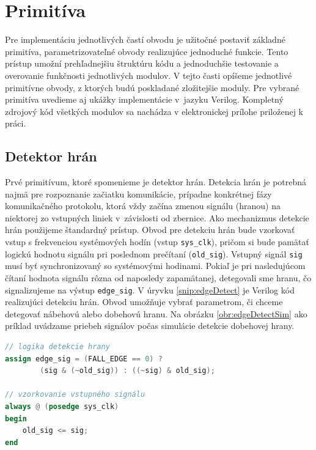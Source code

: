 \section{Primitíva} \label{sek:primitives}
Pre implementáciu jednotlivých častí obvodu je užitočné postaviť základné primitíva, parametrizovateľné obvody realizujúce jednoduché funkcie. Tento prístup umožní prehľadnejšiu štruktúru kódu a jednoduchšie testovanie a overovanie funkčnosti jednotlivých modulov. V tejto časti opíšeme jednotlivé primitívne obvody, z ktorých budú poskladané zložitejšie moduly. Pre vybrané primitíva uvedieme aj ukážky implementácie v~jazyku Verilog. Kompletný zdrojový kód všetkých modulov sa nachádza v elektronickej prílohe priloženej k práci.

\subsection{Detektor hrán} \label{subsek:edgeDetector}
Prvé primitívum, ktoré spomenieme je detektor hrán. Detekcia hrán je potrebná najmä pre rozpoznanie začiatku komunikácie, prípadne konkrétnej fázy komunikačného protokolu, ktorá vždy začína zmenou signálu (hranou) na niektorej zo vstupných liniek v~závislosti od zbernice. Ako mechanizmus detekcie hrán použijeme štandardný prístup. Obvod pre detekciu hrán bude vzorkovať vstup s frekvenciou systémových hodín (vstup \texttt{sys\_clk}), pričom si bude pamätať logickú hodnotu signálu pri poslednom prečítaní (\texttt{old\_sig}). Vstupný signál \texttt{sig} musí byť synchronizovaný so systémovými hodinami. Pokiaľ je pri nasledujúcom čítaní hodnota signálu rôzna od naposledy zapamätanej, detegovali sme hranu, čo signalizujeme na výstup \texttt{edge\_sig}. V úryvku \ref{snip:edgeDetect} je Verilog kód realizujúci detekciu hrán. Obvod umožňuje vybrať parametrom, či chceme detegovať nábehovú alebo dobehovú hranu. Na obrázku \ref{obr:edgeDetectSim} ako príklad uvádzame priebeh signálov počas simulácie detekcie dobehovej hrany.

\begin{lstlisting}[float,language=Verilog,caption={Verilog kód pre detekciu hrán. Parameter \texttt{FALL\_EDGE} určuje, či detegujeme dobehovú alebo nábehovú hranu.},label=snip:edgeDetect]
// logika detekcie hrany
assign edge_sig = (FALL_EDGE == 0) ?
        (sig & (~old_sig)) : ((~sig) & old_sig);

// vzorkovanie vstupného signálu
always @ (posedge sys_clk)
begin
    old_sig <= sig;
end
\end{lstlisting}

